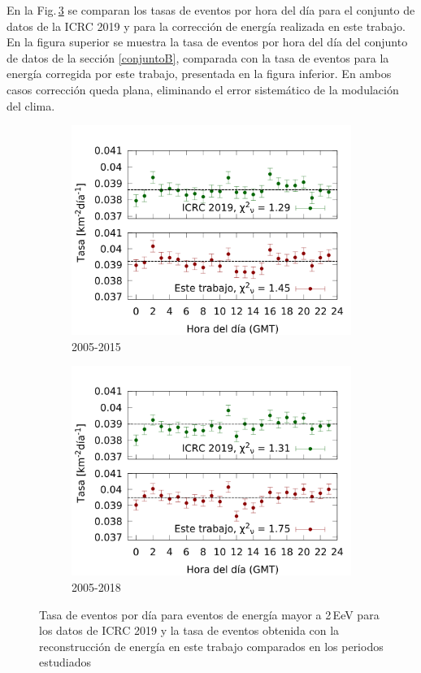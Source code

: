 En la Fig.\,\ref{final} se comparan los tasas de eventos por hora del día para el conjunto de datos de la ICRC 2019 y para la corrección de energía realizada en este trabajo. En la figura superior se muestra la tasa de eventos por hora del día del conjunto de datos de la sección \ref{conjuntoB}, comparada con la tasa de eventos para la energía corregida por este trabajo, presentada en la figura inferior. En ambos casos corrección queda plana, eliminando el error sistemático de la modulación del clima.
			\begin{figure}[H]
    				\begin{subfigure}[b]{0.5\textwidth}
					\includegraphics[width=\textwidth]{../clima/Graphs/2EeV_ICRC_2019_S38_S1000_expected.png}
					\caption{2005-2015} \label{fig:2EeV_expected}
    				\end{subfigure}%
    				\hspace{\fill}
    				\begin{subfigure}[b]{0.5\textwidth}
					\includegraphics[width=\textwidth]{../clima/Graphs/2EeV_ICRC_2019_S38_S1000_expected_05_18.png}
					\caption{2005-2018}\label{fig:2EeV_expected_05_18}
					\end{subfigure}%
					\caption{Tasa de eventos por día para eventos de energía mayor a 2\,EeV para los datos de ICRC 2019 y la tasa de eventos obtenida con la reconstrucción de energía en este trabajo comparados en los periodos estudiados}\label{final}
			\end{figure}
